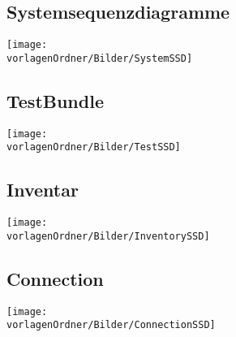 \documentclass[
	ngerman,
	toc=listof, %
	toc=bibliography, %
	footnotes=multiple, %
	parskip=half, %
	numbers=noendperiod %
]{scrartcl}
\newcommand{\vorlagenOrdner}{../../99_Vorlagen} %
\begin{document}
\begin{landscape}
	\section{Systemsequenzdiagramme}
		\texttt{[image: \\vorlagenOrdner/Bilder/SystemSSD]}
		\newpage
\end{landscape}
	
	\subsection{TestBundle}
		\texttt{[image: \\vorlagenOrdner/Bilder/TestSSD]}
	
	\subsection{Inventar}
		\texttt{[image: \\vorlagenOrdner/Bilder/InventorySSD]}

	\subsection{Connection}
		\texttt{[image: \\vorlagenOrdner/Bilder/ConnectionSSD]}
\end{document}
